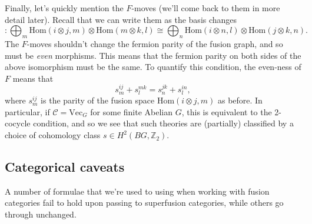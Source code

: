 \documentclass[12pt,a4paper]{article}
\newcommand{\tp}{\otimes}
\newcommand{\zt}{\mathbb{Z}_2}
\newcommand\be            {\begin{equation}}
\newcommand\ee            {\end{equation}}
\newcommand{\mcc}{\mathcal{C}}
\newcommand{\Hom}{\text{Hom}}
\newcommand{\vect}{\text{Vec}}
\begin{document}


Finally, let's quickly mention the $F$-moves (we'll come back to them in more detail later). Recall that we can write them as the basis changes
\be [F^{ijk}_l] : \bigoplus_m \Hom(i\tp j,m) \tp \Hom(m\tp k,l) \cong \bigoplus_n \Hom(i\tp n,l) \tp \Hom(j\tp k,n).\ee
The $F$-moves shouldn't change the fermion parity of the fusion graph, and so must be {\it even} morphisms. This means that the fermion parity on both sides of the above isomorphism must be the same. To quantify this condition, the even-ness of $F$ means that 
\be \label{scond}  s^{ij}_m + s^{mk}_l = s^{jk}_n + s^{in}_l,\ee
where $s^{ij}_m$ is the parity of the fusion space $\Hom(i\tp j,m)$ as before.
In particular, if $\mcc = \vect_G$ for some finite Abelian $G$, this is equivalent to the 2-cocycle condition, and so we see that such theories are (partially) classified by a choice of cohomology class $s \in H^2(BG,\zt)$. 

\subsection{Categorical caveats}\label{sec:ccs}
A number of formulae that we're used to using when working with fusion categories fail to hold upon passing to superfusion categories, while others go through unchanged. 

\end{document}

